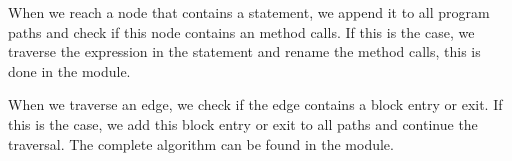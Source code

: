 When we reach a node that contains a statement, we append it to all program paths
and check if this node contains an method calls. If this is the case, we traverse
the expression in the statement and rename the method calls, this is done in the
 module.

When we traverse an edge, we check if the edge contains a block entry or exit. If 
this is the case, we add this block entry or exit to all paths and continue the
traversal. The complete algorithm can be found in the 
 module.